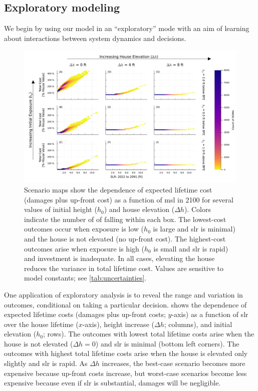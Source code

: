 \documentclass{agujournal2019}
\begin{document}
\subsection{Exploratory modeling}\label{sec:results-exploratory}

We begin by using our model in an ``exploratory'' mode with an aim of learning about interactions between system dynamics and decisions.

\begin{figure}
  \includegraphics[width=\textwidth]{scenario-map-slr-cost}
  \caption{
    Scenario maps show the dependence of expected lifetime cost (damages plus up-front cost) as a function of \acrfull{msl} in 2100 for several values of initial height ($h_0$) and house elevation ($\Delta h$).
    Colors indicate the number of  of falling within each box.
    The lowest-cost outcomes occur when exposure is low ($h_0$ is large and \acrfull{slr} is minimal) and the house is not elevated (no up-front cost).
    The highest-cost outcomes arise when exposure is high ($h_0$ is small and \gls{slr} is rapid) and investment is inadequate.
    In all cases, elevating the house reduces the variance in total lifetime cost.
    Values are sensitive to model constants; see \cref{tab:uncertainties}.
  }\label{fig:scenario-map-slr-cost}
\end{figure}

One application of exploratory analysis is to reveal the range and variation in outcomes, conditional on taking a particular decision.
 shows the dependence of expected lifetime costs (damages plus up-front costs; $y$-axis) as a function of  \gls{slr} over the house lifetime ($x$-axis), height increase ($\Delta h$; columns), and initial elevation ($h_0$; rows).
The outcomes with lowest total lifetime costs arise when the house is not elevated ($\Delta h = 0$) and \gls{slr} is minimal (bottom left corners).
The outcomes with highest total lifetime costs arise when the house is elevated only slightly and \gls{slr} is rapid.
As $\Delta h$ increases, the best-case scenario becomes more expensive because up-front costs increase, but worst-case scenarios become less expensive because even if \gls{slr} is substantial, damages will be negligible.
\end{document}
